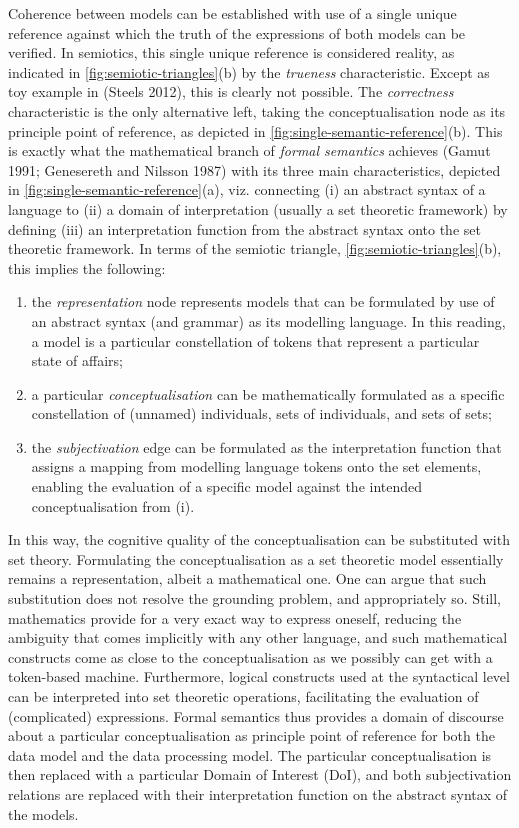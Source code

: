 \documentclass[a4paper,11pt,oneside,oldfontcommands]{memoir}
\theoremstyle{definition}
\theoremstyle{break}		%
\numberwithin{equation}{chapter}
\numberwithin{figure}{chapter}
\begin{document}
Coherence between models can be established with use of a single unique
reference against which the truth of the expressions of both models can
be verified. In semiotics, this single unique reference is considered
reality, as indicated in \cref{fig:semiotic-triangles}(b) by the
\emph{trueness} characteristic. Except as toy example in (Steels 2012),
this is clearly not possible. The \emph{correctness} characteristic is
the only alternative left, taking the conceptualisation node as its
principle point of reference, as depicted in
\cref{fig:single-semantic-reference}(b). This is exactly what the
mathematical branch of \emph{formal semantics} achieves (Gamut 1991;
Genesereth and Nilsson 1987) with its three main characteristics,
depicted in \cref{fig:single-semantic-reference}(a), viz. connecting (i)
an abstract syntax of a language to (ii) a domain of interpretation
(usually a set theoretic framework) by defining (iii) an interpretation
function from the abstract syntax onto the set theoretic framework. In
terms of the semiotic triangle, \cref{fig:semiotic-triangles}(b), this
implies the following:

\begin{enumerate}
\def\labelenumi{(\roman{enumi})}
\tightlist
\item
  the \emph{representation} node represents models that can be
  formulated by use of an abstract syntax (and grammar) as its modelling
  language. In this reading, a model is a particular constellation of
  tokens that represent a particular state of affairs;
\item
  a particular \emph{conceptualisation} can be mathematically formulated
  as a specific constellation of (unnamed) individuals, sets of
  individuals, and sets of sets;
\item
  the \emph{subjectivation} edge can be formulated as the interpretation
  function that assigns a mapping from modelling language tokens onto
  the set elements, enabling the evaluation of a specific model against
  the intended conceptualisation from (i).
\end{enumerate}

In this way, the cognitive quality of the conceptualisation can be
substituted with set theory. Formulating the conceptualisation as a set
theoretic model essentially remains a representation, albeit a
mathematical one. One can argue that such substitution does not resolve
the grounding problem, and appropriately so. Still, mathematics provide
for a very exact way to express oneself, reducing the ambiguity that
comes implicitly with any other language, and such mathematical
constructs come as close to the conceptualisation as we possibly can get
with a token-based machine. Furthermore, logical constructs used at the
syntactical level can be interpreted into set theoretic operations,
facilitating the evaluation of (complicated) expressions. Formal
semantics thus provides a domain of discourse about a particular
conceptualisation as principle point of reference for both the data
model and the data processing model. The particular conceptualisation is
then replaced with a particular Domain of Interest (DoI), and both
subjectivation relations are replaced with their interpretation function
on the abstract syntax of the models.
\end{document}
